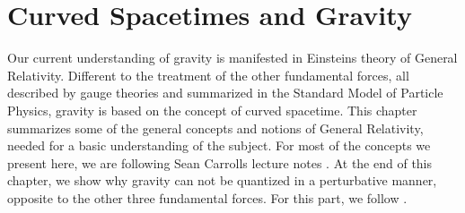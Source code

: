 \chapter{Curved Spacetimes and Gravity}\label{chap:GR}
Our current understanding of gravity is manifested in Einsteins theory of General Relativity. Different to the treatment of the other fundamental forces, all described by gauge theories and summarized in the Standard Model of Particle Physics, gravity is based on the concept of curved spacetime. This chapter summarizes some of the general concepts and notions of General Relativity, needed for a basic understanding of the subject. For most of the concepts we present here, we are following Sean Carrolls lecture notes \cite{CarrollGR}. At the end of this chapter, we show why gravity can not be quantized in a perturbative manner, opposite to the other three fundamental forces. For this part, we follow \cite{PawlowskiNPgaugeLecture}. 

